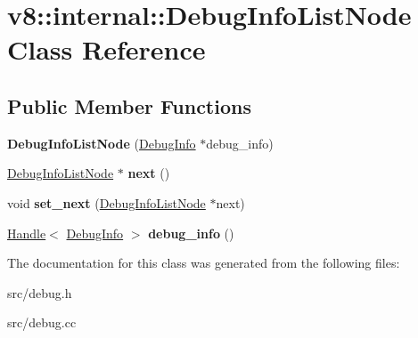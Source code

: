 \hypertarget{classv8_1_1internal_1_1_debug_info_list_node}{}\section{v8\+:\+:internal\+:\+:Debug\+Info\+List\+Node Class Reference}
\label{classv8_1_1internal_1_1_debug_info_list_node}
\subsection*{Public Member Functions}
\begin{DoxyCompactItemize}
\item 
\hypertarget{classv8_1_1internal_1_1_debug_info_list_node_ae87ed88d8d1688aef91989956562a798}{}{\bfseries Debug\+Info\+List\+Node} (\hyperlink{classv8_1_1internal_1_1_debug_info}{Debug\+Info} $\ast$debug\+\_\+info)\label{classv8_1_1internal_1_1_debug_info_list_node_ae87ed88d8d1688aef91989956562a798}

\item 
\hypertarget{classv8_1_1internal_1_1_debug_info_list_node_a94d33d31212f6abebe43b36662bbc6c0}{}\hyperlink{classv8_1_1internal_1_1_debug_info_list_node}{Debug\+Info\+List\+Node} $\ast$ {\bfseries next} ()\label{classv8_1_1internal_1_1_debug_info_list_node_a94d33d31212f6abebe43b36662bbc6c0}

\item 
\hypertarget{classv8_1_1internal_1_1_debug_info_list_node_a736b7fd7b611bdc285125fa76ede956b}{}void {\bfseries set\+\_\+next} (\hyperlink{classv8_1_1internal_1_1_debug_info_list_node}{Debug\+Info\+List\+Node} $\ast$next)\label{classv8_1_1internal_1_1_debug_info_list_node_a736b7fd7b611bdc285125fa76ede956b}

\item 
\hypertarget{classv8_1_1internal_1_1_debug_info_list_node_ad815860a8e9b66ba266340e4870f4489}{}\hyperlink{classv8_1_1internal_1_1_handle}{Handle}$<$ \hyperlink{classv8_1_1internal_1_1_debug_info}{Debug\+Info} $>$ {\bfseries debug\+\_\+info} ()\label{classv8_1_1internal_1_1_debug_info_list_node_ad815860a8e9b66ba266340e4870f4489}

\end{DoxyCompactItemize}


The documentation for this class was generated from the following files\+:\begin{DoxyCompactItemize}
\item 
src/debug.\+h\item 
src/debug.\+cc\end{DoxyCompactItemize}
